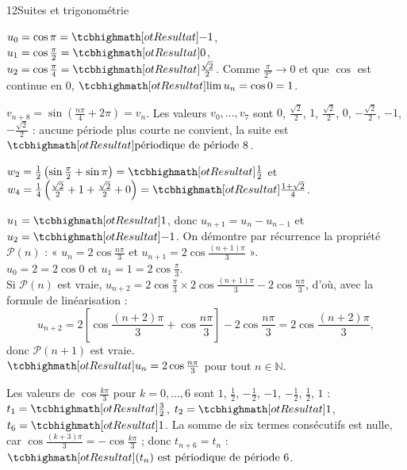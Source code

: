 \begin{corrige}{12}{Suites et trigonométrie}
\begin{questions}
  \item $u_0=\cos\pi=\res{-1}$, $u_1=\cos\frac{\pi}{2}=\res{0}$, $u_2=\cos\frac{\pi}{4}=\res{\frac{\sqrt2}{2}}$. Comme $\frac{\pi}{2^{n}}\to0$ et que
    $\cos$ est continue en $0$, $\res{\lim u_n=\cos0=1}$.
  \item $v_{n+8}=\sin\left(\frac{n\pi}{4}+2\pi\right)=v_n$. Les valeurs $v_0,\dots,v_7$ sont $0$, $\frac{\sqrt2}{2}$, $1$, $\frac{\sqrt2}{2}$, $0$,
    $-\frac{\sqrt2}{2}$, $-1$, $-\frac{\sqrt2}{2}$ : aucune période plus courte ne convient, la suite est $\res{\text{périodique de période }8}$.
  \item $w_2=\frac12\left(\sin\frac{\pi}{2}+\sin\pi\right)=\res{\frac12}$ et $w_4=\frac14\left(\frac{\sqrt2}{2}+1+\frac{\sqrt2}{2}+0\right)=\res{\frac{1+\sqrt2}{4}}$.
  \item $u_1=\res{1}$, donc $u_{n+1}=u_n-u_{n-1}$ et $u_2=\res{-1}$. On démontre par récurrence la propriété
    $\mathcal{P}(n)$ : « $u_n=2\cos\frac{n\pi}{3}$ et $u_{n+1}=2\cos\frac{(n+1)\pi}{3}$ ».\\
     $u_0=2=2\cos0$ et $u_1=1=2\cos\frac{\pi}{3}$.\\
     Si $\mathcal{P}(n)$ est vraie, $u_{n+2}=2\cos\frac{\pi}{3}\times2\cos\frac{(n+1)\pi}{3}-2\cos\frac{n\pi}{3}$, d'où,
    avec la formule de linéarisation :
    \[ u_{n+2}=2\left[\cos\frac{(n+2)\pi}{3}+\cos\frac{n\pi}{3}\right]-2\cos\frac{n\pi}{3}=2\cos\frac{(n+2)\pi}{3}, \]
    donc $\mathcal{P}(n+1)$ est vraie.\\
     $\res{u_n=2\cos\frac{n\pi}{3}}$ pour tout $n\in\mathbb{N}$.
  \item Les valeurs de $\cos\frac{k\pi}{3}$ pour $k=0,\dots,6$ sont $1$, $\frac12$, $-\frac12$, $-1$, $-\frac12$, $\frac12$, $1$ :
    $t_1=\res{\frac32}$, $t_2=\res{1}$, $t_6=\res{1}$. La somme de six termes consécutifs est nulle, car
    $\cos\frac{(k+3)\pi}{3}=-\cos\frac{k\pi}{3}$ ; donc $t_{n+6}=t_n$ : $\res{(t_n)\text{ est périodique de période }6}$.
\end{questions}
\end{corrige}

